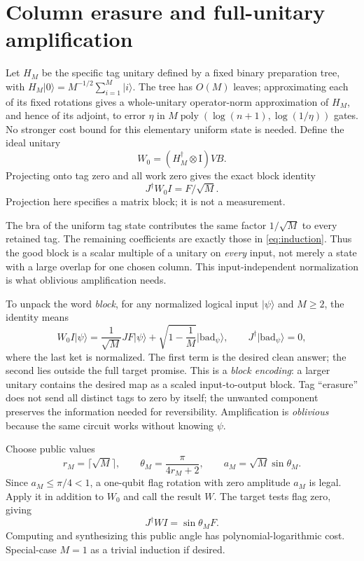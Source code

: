 \documentclass[11pt]{article}
\theoremstyle{definition}
\newcommand{\ket}[1]{\lvert #1\rangle}
\newcommand{\Id}{\mathrm I}
\newcommand{\poly}{\operatorname{poly}}
\begin{document}
\section{Column erasure and full-unitary amplification}\label{sec:oaa}

Let $H_M$ be the specific tag unitary defined by a fixed binary preparation
tree, with $H_M\ket0=M^{-1/2}\sum_{i=1}^M\ket i$. The tree has $O(M)$
leaves; approximating each of its fixed rotations gives a whole-unitary
operator-norm approximation of $H_M$, and hence of its adjoint, to error
$\eta$ in $M\poly(\log(n+1),\log(1/\eta))$ gates.
No stronger cost bound for this elementary uniform
state is needed. Define the ideal unitary
\[
 W_0=(H_M^\dagger\otimes\Id)VB.
\]
Projecting onto tag zero and all work zero gives the exact block identity
\begin{equation}\label{eq:block}
 J^\dagger W_0 I=F/\sqrt M.
\end{equation}
Projection here specifies a matrix block; it is not a measurement.

The bra of the uniform tag state contributes the same factor
$1/\sqrt M$ to every retained tag. The remaining coefficients are exactly
those in \eqref{eq:induction}. Thus the good block is a scalar multiple
of a unitary on \emph{every} input, not merely a state with a large overlap
for one chosen column. This input-independent normalization is what
oblivious amplification needs.

To unpack the word \emph{block}, for any normalized logical input
$\ket\psi$ and $M\ge2$, the identity means
\[
 W_0 I\ket\psi=\frac1{\sqrt M}JF\ket\psi
       +\sqrt{1-\frac1M}\ket{\mathrm{bad}_\psi},
 \qquad J^\dagger\ket{\mathrm{bad}_\psi}=0,
\]
where the last ket is normalized. The first term is the desired clean
answer; the second lies outside the full target promise. This is a
\emph{block encoding}: a larger unitary contains the desired map as a
scaled input-to-output block. Tag ``erasure'' does not send all distinct
tags to zero by itself; the unwanted component preserves the information
needed for reversibility. Amplification is \emph{oblivious} because the
same circuit works without knowing $\psi$.

Choose public values
\begin{equation}\label{eq:attenuate}
 r_M=\lceil\sqrt M\rceil,\qquad
 \theta_M=\frac{\pi}{4r_M+2},\qquad a_M=\sqrt M\sin\theta_M.
\end{equation}
Since $a_M\le\pi/4<1$, a one-qubit flag rotation with zero amplitude $a_M$
is legal. Apply it in addition to $W_0$ and call the result $W$.
The target tests flag zero, giving
\begin{equation}\label{eq:attenuated}
 J^\dagger W I=\sin\theta_M F.
\end{equation}
Computing and synthesizing this public angle has polynomial-logarithmic
cost. Special-case $M=1$ as a trivial induction if desired.
\end{document}
